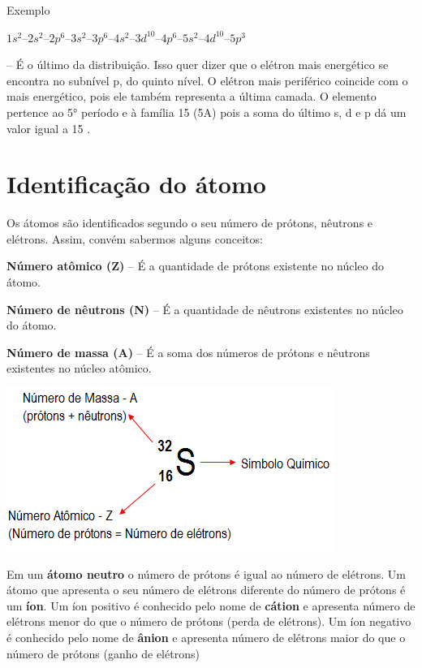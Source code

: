\documentclass[10pt]{scrartcl}
\begin{document}
\begin{Box2}{Exemplo}

 \(1s^2 – 2s^2 – 2p^6 – 3s^2 – 3 p^6 – 4 s^2 – 3 d^{10} – 4 p^6 – 5 s^2 – 4 d^{10} – 5 p^3\) 
\end{Box2}

\textbf{} – É o último da distribuição. Isso quer dizer que o elétron mais energético se encontra no subnível p, do quinto nível. O elétron mais periférico coincide com o mais energético, pois ele também representa a última camada.
O elemento pertence ao  \ang{5} período e à família 15 (5A) pois a soma do último s, d e p dá um valor igual a 15 .

\section{Identificação do átomo}
\label{sec:org6924b51}

Os átomos são identificados segundo o seu número de prótons, nêutrons e elétrons. Assim, convém sabermos alguns conceitos:

\textbf{Número atômico (Z)} – É a quantidade de prótons existente no núcleo do átomo.

\textbf{Número de nêutrons (N)} – É a quantidade de nêutrons existentes no núcleo do átomo.

\textbf{Número de massa (A)} – É a soma dos números de prótons e nêutrons existentes no núcleo atômico.

\begin{center}
\includegraphics[width=.9\linewidth]{Quimica-Geral-Aula/iso.png}
\end{center}

Em um \textbf{átomo neutro} o número de prótons é igual ao número de elétrons. Um átomo que apresenta o seu número de elétrons diferente do número de prótons é um \textbf{íon}. Um íon positivo é conhecido pelo nome de \textbf{cátion} e apresenta número de elétrons menor do que o número de prótons (perda de elétrons). Um íon negativo é conhecido pelo nome de \textbf{ânion} e apresenta número de elétrons maior do que o número de prótons (ganho de elétrons)
\end{document}
